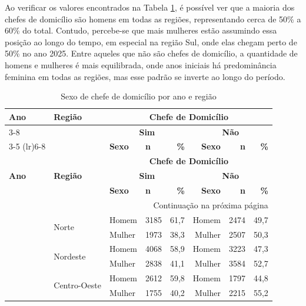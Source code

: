 \documentclass[12pt,a4paper,header]{abnt}
\begin{document}
\FloatBarrier
Ao verificar os valores encontrados na Tabela \ref{tab:chefe_domicilio}, é possível ver que a maioria dos chefes de domicílio são homens em todas as regiões, representando cerca de 50\% a 60\% do total. Contudo, percebe-se que mais mulheres estão assumindo essa posição ao longo do tempo, em especial na região Sul, onde elas chegam perto de 50\% no ano 2025. Entre aqueles que não são chefes de domicílio, a quantidade de homens e mulheres é mais equilibrada, onde anos iniciais há predominância feminina em todas as regiões, mas esse padrão se inverte ao longo do período.
\begin{center}
\small
\begin{longtable}{llllrrrr}
\caption{Sexo de chefe de domicílio por ano e região}
\label{tab:chefe_domicilio} \\
\toprule
\multirow{3}{*}{\textbf{Ano}} & \multirow{3}{*}{\textbf{Região}} & \multicolumn{6}{c}{\textbf{Chefe de Domicílio}} \\
\cmidrule(lr){3-8}
& & \multicolumn{3}{c}{\textbf{Sim}} & \multicolumn{3}{c}{\textbf{Não}} \\
\cmidrule(lr){3-5} \cmidrule(lr){6-8}
& & \textbf{Sexo} & \textbf{n} & \textbf{\%} & \textbf{Sexo} & \textbf{n} & \textbf{\%} \\
\midrule
\endfirsthead
\toprule
\multirow{3}{*}{\textbf{Ano}} & \multirow{3}{*}{\textbf{Região}} & \multicolumn{6}{c}{\textbf{Chefe de Domicílio}} \\
\cmidrule(lr){3-8}
& & \multicolumn{3}{c}{\textbf{Sim}} & \multicolumn{3}{c}{\textbf{Não}} \\
\cmidrule(lr){3-5} \cmidrule(lr){6-8}
& & \textbf{Sexo} & \textbf{n} & \textbf{\%} & \textbf{Sexo} & \textbf{n} & \textbf{\%} \\
\midrule
\endhead
\midrule
\multicolumn{8}{r}{\small Continuação na próxima página} \\
\midrule
\endfoot
\bottomrule
\endlastfoot
\multirow{10}{*}{2016} & \multirow{2}{*}{Norte} & Homem & 3185 & 61,7 & Homem & 2474 & 49,7 \\
\nopagebreak
& & Mulher & 1973 & 38,3 & Mulher & 2507 & 50,3 \\
& \multirow{2}{*}{Nordeste} & Homem & 4068 & 58,9 & Homem & 3223 & 47,3 \\
\nopagebreak
& & Mulher & 2838 & 41,1 & Mulher & 3584 & 52,7 \\
& \multirow{2}{*}{Centro-Oeste} & Homem & 2612 & 59,8 & Homem & 1797 & 44,8 \\
\nopagebreak
& & Mulher & 1755 & 40,2 & Mulher & 2215 & 55,2 \\

\end{longtable}
\end{center}
\end{document}
